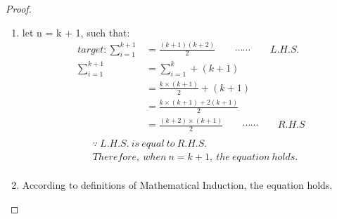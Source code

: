 \documentclass{amsart}
\begin{document}
\begin{proof}
\begin{enumerate}
        \item{let n = k + 1, such that:}
        \begin{align*}
            target: \displaystyle\sum_{i=1}^{k+1} & = \frac{(k+1)(k+2)}{2} \qquad \cdots \cdots \qquad L.H.S.\\[12pt]
            \displaystyle\sum_{i=1}^{k+1} & = \displaystyle\sum_{i=1}^{k} + (k+1)\\[12pt] 
            & = \frac{k \times (k+1)}{2} + (k+1)\\[12pt] 
            & = \frac{k \times (k+1) + 2(k+1)}{2}\\[12pt]
            & = \frac{(k+2) \times (k+1)}{2} \qquad \cdots \cdots \qquad R.H.S\\[12pt]
        \end{align*}
        \begin{align*}
           & \because\ L.H.S.\ is\ equal\ to\ R.H.S. \\[12pt]
           &  Therefore,\ when\ n = k + 1,\ the\ equation\ holds.\\[12pt] 
        \end{align*}
    \item{According to definitions of Mathematical Induction, the equation holds.}
	\end{enumerate}
	\end{proof}
\end{document}
